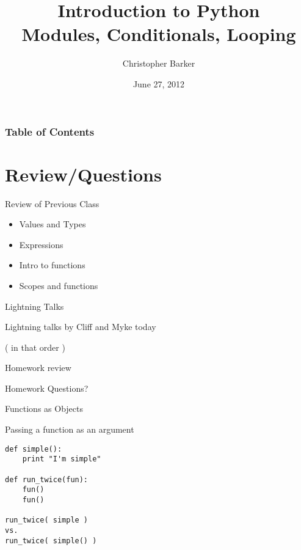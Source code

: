 \documentclass{beamer}
\title[Intro to Python: Week 2]{Introduction  to Python\\ Modules, Conditionals, Looping}
\author{Christopher Barker}
\institute{UW Continuing Education / Isilon}
\date{June 27, 2012}
\begin{document}
\begin{frame}
  \titlepage
\end{frame}

\begin{frame}
\frametitle{Table of Contents}
  \tableofcontents
\end{frame}


\section{Review/Questions}

\begin{frame}{Review of Previous Class}

\begin{itemize}
  \item Values and Types
  \item Expressions
  \item Intro to functions
  \item Scopes and functions 
\end{itemize}

\end{frame}


\begin{frame}{Lightning Talks}

\vfill
{\Large Lightning talks by Cliff and Myke today}

\vfill
{\large ( in that order )}
\vfill

\end{frame}


\begin{frame}{Homework review}

  {\Large Homework Questions? }

\end{frame}

\begin{frame}[fragile]{Functions as Objects}

  {\Large Passing a function as an argument}

\begin{verbatim}
def simple():
    print "I'm simple"

def run_twice(fun):
    fun()
    fun()

run_twice( simple )
vs.
run_twice( simple() )
\end{verbatim}

\end{frame}
\end{document}
